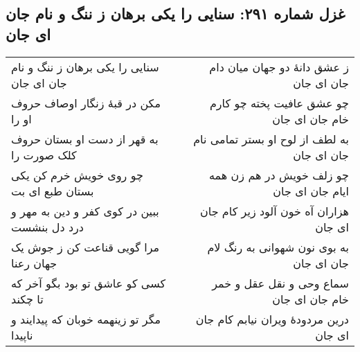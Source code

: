 \begin{center}
\section*{غزل شماره ۲۹۱: سنایی را یکی برهان ز ننگ و نام جان ای جان}
\label{sec:291}
\begin{longtable}{l p{0.5cm} r}
سنایی را یکی برهان ز ننگ و نام جان ای جان
&&
ز عشق دانهٔ دو جهان میان دام جان ای جان
\\
مکن در قبهٔ زنگار اوصاف حروف او را
&&
چو عشق عافیت پخته چو کارم خام جان ای جان
\\
به قهر از دست او بستان حروف کلک صورت را
&&
به لطف از لوح او بستر تمامی نام جان ای جان
\\
چو روی خویش خرم کن یکی بستان طبع ای بت
&&
چو زلف خویش در هم زن همه ایام جان ای جان
\\
ببین در کوی کفر و دین به مهر و درد دل بنشست
&&
هزاران آه خون آلود زیر کام جان ای جان
\\
مرا گویی قناعت کن ز جوش یک جهان رعنا
&&
به بوی نون شهوانی به رنگ لام جان ای جان
\\
کسی کو عاشق تو بود بگو آخر که تا چکند
&&
سماع وحی و نقل عقل و خمر خام جان ای جان
\\
مگر تو زینهمه خوبان که پیدایند و ناپیدا
&&
درین مردودهٔ ویران نیابم کام جان ای جان
\\
\end{longtable}
\end{center}
